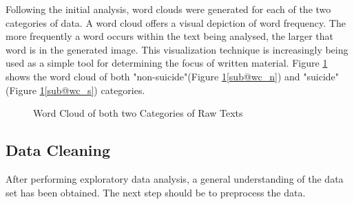 \documentclass[ %
                    author={Bocheng Wang},
                supervisor={Dr. Qiang Liu},
                    degree={MSc},
                     title={A Research on Identification of Suicide Ideation in Texts with Multiple Models},
                      type={},
                      year={2024}]{dissertation}
\begin{document}
Following the initial analysis, word clouds were generated for each of the two categories of data. A word cloud offers a visual depiction of word frequency. The more frequently a word occurs within the text being analysed, the larger that word is in the generated image. This visualization technique is increasingly being used as a simple tool for determining the focus of written material.\cite{atenstaedt2012word} Figure \ref{fig:word cloud} shows the word cloud of both "non-suicide"(Figure \ref{fig:word cloud}\ref{sub@wc_n}) and "suicide"(Figure \ref{fig:word cloud}\ref{sub@wc_s}) categories.

\begin{figure}[h]
      \centering
      \hfil
      \caption{Word Cloud of both two Categories of Raw Texts}
      \label{fig:word cloud}
\end{figure}

\subsection{Data Cleaning}
\noindent
After performing exploratory data analysis, a general understanding of the data set has been obtained. The next step should be to preprocess the data.
\end{document}

